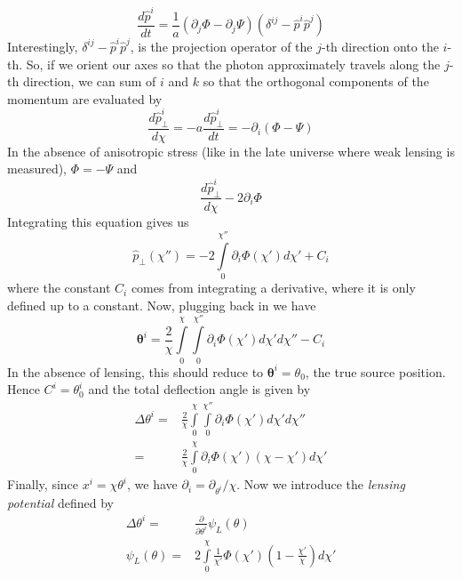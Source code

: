 \begin{equation}
	\frac{d\hat{p}^i}{dt} = \frac{1}{a}\left( \partial_j\Phi - \partial_j\Psi \right)(\delta^{ij}-\hat{p}^i\hat{p}^j)
\end{equation}
Interestingly, $\delta^{ij}-\hat p^i \hat p^j$, is the projection operator of the $j$-th direction onto the $i$-th. So, if we orient our axes so that the photon approximately travels along the $j$-th direction, we can sum of $i$ and $k$ so that the orthogonal components of the momentum are evaluated by
\begin{equation}
	\frac{d\hat{p}^i_\perp}{d\chi} = - a \frac{d\hat{p}^i_\perp}{dt} = -\partial_i(\Phi-\Psi)
\end{equation}
In the absence of anisotropic stress (like in the late universe where weak lensing is measured), $\Phi=-\Psi$ and 
\begin{equation}
	\frac{d\hat{p}^i_\perp}{d\chi} -2\partial_i\Phi
\end{equation}
Integrating this equation gives us
\begin{equation}
	\hat p_\perp (\chi'') = -2\int\limits_0^{\chi''}\partial_i\Phi(\chi') d\chi' + C_i
\end{equation}
where the constant $C_i$ comes from integrating a derivative, where it is only defined up to a constant. Now, plugging back in we have
\begin{equation}
	\mathbf{\theta}^i = \frac{2}{\chi}\int\limits_0^\chi \int\limits_0^{\chi''}\partial_i\Phi(\chi') d\chi' d\chi'' - C_i
\end{equation}
In the absence of lensing, this should reduce to $\mathbf{\theta}^i = \theta_0$, the true source position. Hence $C^i=\theta^i_0$ and the total deflection angle is given by
\begin{equation}
	\begin{split}
		\Delta\theta^i =& \frac{2}{\chi}\int\limits_0^\chi \int\limits_0^{\chi''}\partial_i\Phi(\chi') d\chi' d\chi''\\
		=& \frac{2}{\chi}\int\limits_0^\chi \partial_i\Phi(\chi') (\chi-\chi') d\chi'
	\end{split}
\end{equation}
Finally, since $x^i=\chi\theta^i$, we have $\partial_i = \partial_{\theta^i}/\chi$. Now we introduce the \textit{lensing potential} defined by
\begin{equation}
	\begin{split}
		\Delta\theta^i =& \frac{\partial}{\partial \theta^i}\psi_L(\theta) \\
		\psi_L(\theta) =& 2\int\limits_0^\chi \frac{1}{\chi'}\Phi(\chi') \left(1-\frac{\chi'}{\chi}\right) d\chi'
	\end{split}
\end{equation}
